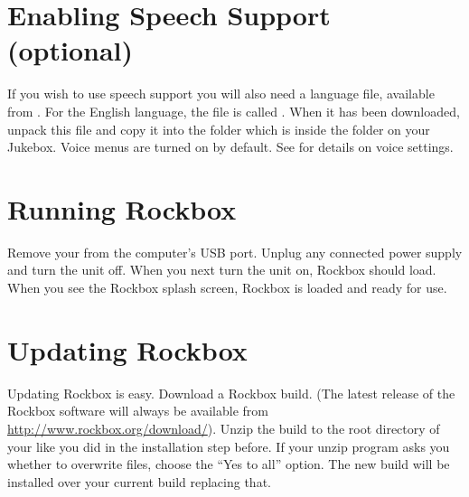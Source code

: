 %


\section{Enabling Speech Support (optional)}\label{sec:enabling_speech_support} 
If you wish to use speech support you will also need a language file, available
from .  For the English language, the file is called
. When it has been downloaded, unpack this file and copy it
into the  folder which is inside the  folder on
your Jukebox. Voice menus are turned on by default. See
 for details on voice settings.

\section{Running Rockbox} 
Remove your \dap{} from the computer's USB port. Unplug any connected power supply
and turn the unit off. When you next turn the unit on, Rockbox should load. When
you see the Rockbox splash screen, Rockbox is loaded and ready for use.


\section{Updating Rockbox} Updating Rockbox is easy. Download a Rockbox build.
(The latest release of the Rockbox software will always be available from 
\url{http://www.rockbox.org/download/}). Unzip the build to the root directory 
of your \dap{} like you did in the installation step before. If your unzip
program asks you whether to overwrite files, choose the ``Yes to all'' option.
The new build will be installed over your current build replacing that.

